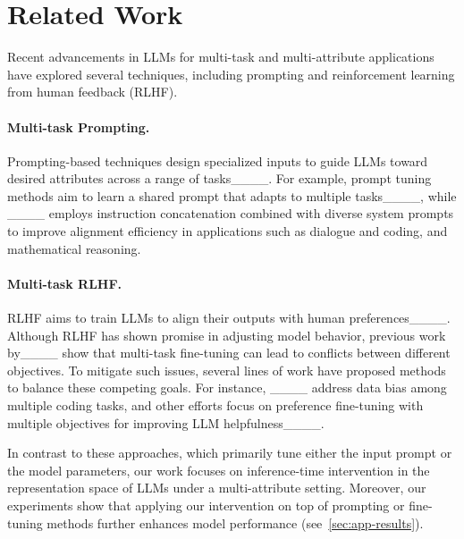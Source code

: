 \section{Related Work}
Recent advancements in LLMs for multi-task and multi-attribute applications have explored several techniques, including prompting and reinforcement learning from human feedback (RLHF). 

\paragraph{Multi-task Prompting.} Prompting-based techniques design specialized inputs to guide LLMs toward desired attributes across a range of tasks____. For example, prompt tuning methods aim to learn a shared prompt that adapts to multiple tasks____, while ____ employs instruction concatenation combined with diverse system prompts to improve alignment efficiency in applications such as dialogue and coding, and mathematical reasoning.

\paragraph{Multi-task RLHF.} RLHF aims to train LLMs to align their outputs with human preferences____. Although RLHF has shown promise in adjusting model behavior, previous work by____ show that multi-task fine-tuning can lead to conflicts between different objectives. To mitigate such issues, several lines of work have proposed methods to balance these competing goals. For instance, ____ address data bias among multiple coding tasks, and other efforts focus on preference fine-tuning with multiple objectives for improving LLM helpfulness____.

In contrast to these approaches, which primarily tune either the input prompt or the model parameters, our work focuses on inference-time intervention in the representation space of LLMs under a multi-attribute setting. 
Moreover, our experiments show that applying our intervention on top of prompting or fine-tuning methods further enhances model performance (see~\cref{sec:app-results}).
